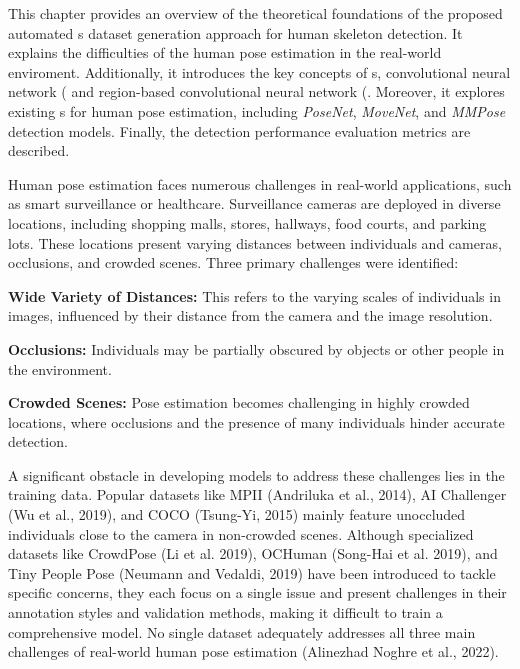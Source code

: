 This chapter provides an overview of the theoretical foundations of the proposed automated \NN\-s dataset generation approach for human skeleton detection. It explains the difficulties of the human pose estimation in the real-world enviroment. Additionally, it introduces the key concepts of \NN\-s, convolutional neural network (\CNN\) and region-based convolutional neural network (\RCNN\). Moreover, it explores existing \NN\-s for human pose estimation, including {\em PoseNet}, {\em MoveNet}, and {\em MMPose} detection models. Finally, the detection performance evaluation metrics are described.

Human pose estimation faces numerous challenges in real-world applications, such as smart surveillance or healthcare. Surveillance cameras are deployed in diverse locations, including shopping malls, stores, hallways, food courts, and parking lots. These locations present varying distances between individuals and cameras, occlusions, and crowded scenes. Three primary challenges were identified:

\startitemize[n]
    \item {\bf Wide Variety of Distances:} This refers to the varying scales of individuals in images, influenced by their distance from the camera and the image resolution.
    \item {\bf Occlusions:} Individuals may be partially obscured by objects or other people in the environment.
    \item {\bf Crowded Scenes:} Pose estimation becomes challenging in highly crowded locations, where occlusions and the presence of many individuals hinder accurate detection.
\stopitemize

A significant obstacle in developing models to address these challenges lies in the training data. Popular datasets like MPII (\scc Andriluka et al., 2014), AI Challenger (\scc Wu et al., 2019), and COCO (\scc Tsung-Yi, 2015) mainly feature unoccluded individuals close to the camera in non-crowded scenes. Although specialized datasets like CrowdPose (\scc Li et al. 2019), OCHuman (\scc Song-Hai et al. 2019), and Tiny People Pose (\scc Neumann and Vedaldi, 2019) have been introduced to tackle specific concerns, they each focus on a single issue and present challenges in their annotation styles and validation methods, making it difficult to train a comprehensive model. No single dataset adequately addresses all three main challenges of real-world human pose estimation (\scc Alinezhad Noghre et al., 2022).

